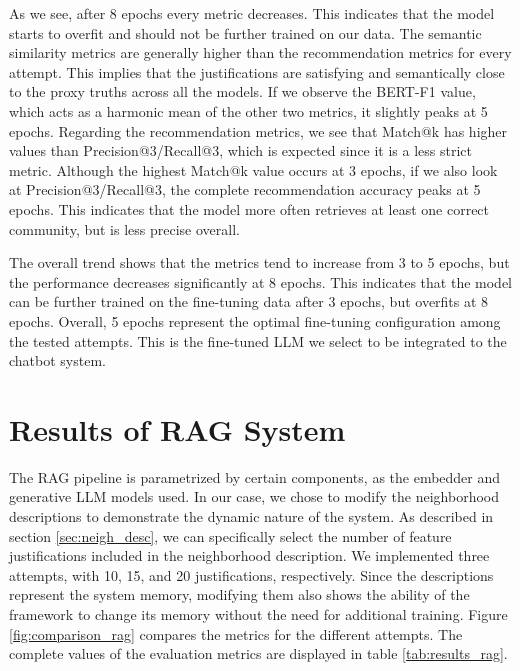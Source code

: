 As we see, after 8 epochs every metric decreases. This indicates that the model starts to overfit and should not be further trained on our data. The semantic similarity metrics are generally higher than the recommendation metrics for every attempt. This implies that the justifications are satisfying and semantically close to the proxy truths across all the models. If we observe the BERT-F1 value, which acts as a harmonic mean of the other two metrics, it slightly peaks at 5 epochs. Regarding the recommendation metrics, we see that Match@k has higher values than Precision@3/Recall@3, which is expected since it is a less strict metric. Although the highest Match@k value occurs at 3 epochs, if we also look at Precision@3/Recall@3, the complete recommendation accuracy peaks at 5 epochs. This indicates that the model more often retrieves at least one correct community, but is less precise overall.

The overall trend shows that the metrics tend to increase from 3 to 5 epochs, but the performance decreases significantly at 8 epochs. This indicates that the model can be further trained on the fine-tuning data after 3 epochs, but overfits at 8 epochs. Overall, 5 epochs represent the optimal fine-tuning configuration among the tested attempts. This is the fine-tuned LLM we select to be integrated to the chatbot system. 

\section{Results of RAG System}

The RAG pipeline is parametrized by certain components, as the embedder and generative LLM models used. In our case, we chose to modify the neighborhood descriptions to demonstrate the dynamic nature of the system. As described in section \ref{sec:neigh_desc}, we can specifically select the number of feature justifications included in the neighborhood description. We implemented three attempts, with 10, 15, and 20 justifications, respectively. Since the descriptions represent the system memory, modifying them also shows the ability of the framework to change its memory without the need for additional training. Figure \ref{fig:comparison_rag} compares the metrics for the different attempts. The complete values of the evaluation metrics are displayed in table \ref{tab:results_rag}.

